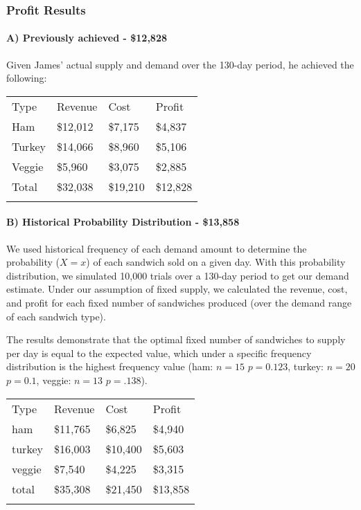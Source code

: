 \documentclass[]{article}
\begin{document}
\subsubsection{Profit Results}\label{profit-results}

\paragraph{A) Previously achieved -
\$12,828}\label{a-previously-achieved---12828}

Given James' actual supply and demand over the 130-day period, he
achieved the following:

\begin{longtable}[c]{@{}llll@{}}
\toprule\addlinespace
Type & Revenue & Cost & Profit
\\\addlinespace
\midrule\endhead
Ham & \$12,012 & \$7,175 & \$4,837
\\\addlinespace
Turkey & \$14,066 & \$8,960 & \$5,106
\\\addlinespace
Veggie & \$5,960 & \$3,075 & \$2,885
\\\addlinespace
Total & \$32,038 & \$19,210 & \$12,828
\\\addlinespace
\bottomrule
\end{longtable}

\paragraph{B) Historical Probability Distribution -
\$13,858}\label{b-historical-probability-distribution---13858}

We used historical frequency of each demand amount to determine the
probability ($X=x$) of each sandwich sold on a given day. With this
probability distribution, we simulated 10,000 trials over a 130-day
period to get our demand estimate. Under our assumption of fixed supply,
we calculated the revenue, cost, and profit for each fixed number of
sandwiches produced (over the demand range of each sandwich type).

The results demonstrate that the optimal fixed number of sandwiches to
supply per day is equal to the expected value, which under a specific
frequency distribution is the highest frequency value (ham: $n=15$
$p=0.123$, turkey: $n=20$ $p=0.1$, veggie: $n=13$ $p=.138$).

\begin{longtable}[c]{@{}llll@{}}
\toprule\addlinespace
Type & Revenue & Cost & Profit
\\\addlinespace
\midrule\endhead
ham & \$11,765 & \$6,825 & \$4,940
\\\addlinespace
turkey & \$16,003 & \$10,400 & \$5,603
\\\addlinespace
veggie & \$7,540 & \$4,225 & \$3,315
\\\addlinespace
total & \$35,308 & \$21,450 & \$13,858
\\\addlinespace
\bottomrule
\end{longtable}
\end{document}
